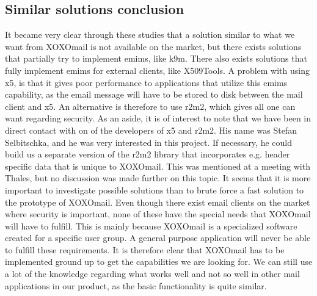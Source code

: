 \subsection{Similar solutions conclusion}
It became very clear through these studies that a solution similar to what we want from XOXOmail is not available on the market, but there exists solutions that partially try to implement \gls{emims}, like \gls{k9m}. There also exists solutions that fully implement \gls{emims} for external clients, like X509Tools. A problem with using \gls{x5}, is that it gives poor performance to applications that utilize this \gls{emims} capability, as the email message will have to be stored to disk between the mail client and \gls{x5}. An alternative is therefore to use \gls{r2m2}, which gives all one can want regarding security.
\newline
\newline
As an aside, it is of interest to note that we have been in direct contact with on of the developers of \gls{x5} and \gls{r2m2}. His name was Stefan Selbitschka, and he was very interested in this project. If necessary, he could build us a separate version of the \gls{r2m2} library that incorporates e.g. header specific data that is unique to XOXOmail. This was mentioned at a meeting with Thales, but no discussion was made further on this topic. It seems that it is more important to investigate possible solutions than to brute force a fast solution to the prototype of XOXOmail.
\newline
\newline
Even though there exist email clients on the market where security is important, none of these have the special needs that XOXOmail will have to fulfill. This is mainly because XOXOmail is a specialized software created for a specific user group. A general purpose application will never be able to fulfill these requirements. It is therefore clear that XOXOmail has to be implemented ground up to get the capabilities we are looking for. We can still use a lot of the knowledge regarding what works well and not so well in other mail applications in our product, as the basic functionality is quite similar.

